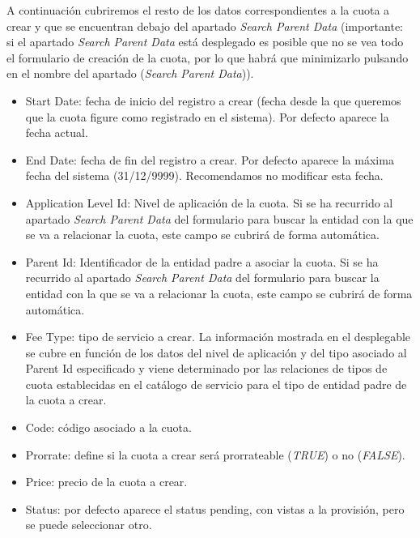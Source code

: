 A continuación cubriremos el resto de los datos correspondientes a la cuota a crear y que se encuentran debajo del apartado \emph{Search Parent Data} (importante: si el apartado \emph{Search Parent Data} está desplegado es posible que no se vea todo el formulario de creación de la cuota, por lo que habrá que minimizarlo pulsando en el nombre del apartado (\emph{Search Parent Data})).
\begin{itemize}
	\item Start Date: fecha de inicio del registro a crear (fecha desde la que queremos que la cuota figure como registrado en el sistema). Por defecto aparece la fecha actual.
	\item End Date: fecha de fin del registro a crear. Por defecto aparece la máxima fecha del sistema (31/12/9999). Recomendamos no modificar esta fecha.
	\item Application Level Id: Nivel de aplicación de la cuota. Si se ha recurrido al apartado \emph{Search Parent Data} del formulario para buscar la entidad con la que se va a relacionar la cuota, este campo se cubrirá de forma automática. 
	\item Parent Id: Identificador de la entidad padre a asociar la cuota. Si se ha recurrido al apartado \emph{Search Parent Data} del formulario para buscar la entidad con la que se va a relacionar la cuota, este campo se cubrirá de forma automática. 
	\item Fee Type: tipo de servicio a crear. La información mostrada en el desplegable se cubre en función de los datos del nivel de aplicación y del tipo asociado al Parent Id especificado y viene determinado por las relaciones de tipos de cuota establecidas en el catálogo de servicio para el tipo de entidad padre de la cuota a crear.
	\item Code: código asociado a la cuota.
	\item Prorrate: define si la cuota a crear será prorrateable (\textit{TRUE}) o no (\textit{FALSE}).
	\item Price: precio de la cuota a crear.
	\item Status: por defecto aparece el status pending, con vistas a la provisión, pero se puede seleccionar otro.
\end{itemize}



